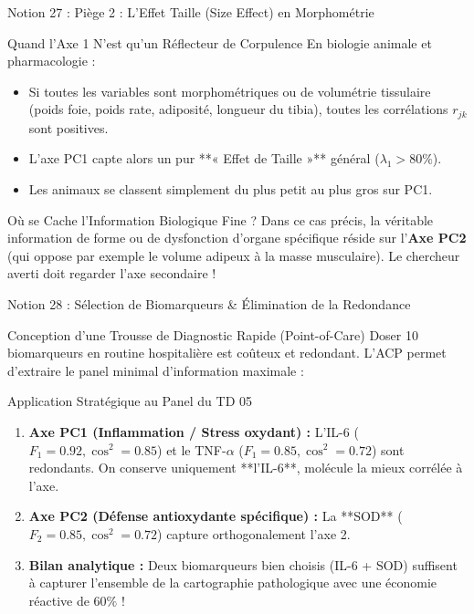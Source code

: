 \documentclass[aspectratio=169,10pt]{beamer}
\begin{document}
\begin{frame}{Notion 27 : Piège 2 : L'Effet Taille (Size Effect) en Morphométrie}
  \begin{warnbox}{Quand l'Axe 1 N'est qu'un Réflecteur de Corpulence}
    \footnotesize
    En biologie animale et pharmacologie :
    \begin{itemize}
      \item Si toutes les variables sont morphométriques ou de volumétrie tissulaire (poids foie, poids rate, adiposité, longueur du tibia), toutes les corrélations $r_{jk}$ sont positives.
      \item L'axe PC1 capte alors un pur **« Effet de Taille »** général ($\lambda_1 > 80\%$).
      \item Les animaux se classent simplement du plus petit au plus gros sur PC1.
    \end{itemize}
  \end{warnbox}
  \vspace{1mm}
  \begin{takeawaybox}{Où se Cache l'Information Biologique Fine ?}
    \footnotesize
    Dans ce cas précis, la véritable information de forme ou de dysfonction d'organe spécifique réside sur l'\textbf{Axe PC2} (qui oppose par exemple le volume adipeux à la masse musculaire). Le chercheur averti doit regarder l'axe secondaire !
  \end{takeawaybox}
\end{frame}

\begin{frame}{Notion 28 : Sélection de Biomarqueurs \& Élimination de la Redondance}
  \begin{conceptbox}{Conception d'une Trousse de Diagnostic Rapide (Point-of-Care)}
    \footnotesize
    Doser 10 biomarqueurs en routine hospitalière est coûteux et redondant. L'ACP permet d'extraire le panel minimal d'information maximale :
  \end{conceptbox}
  \vspace{1mm}
  \begin{biobox}{Application Stratégique au Panel du TD 05}
    \footnotesize
    \begin{enumerate}
      \item \textbf{Axe PC1 (Inflammation / Stress oxydant) :} L'IL-6 ($F_1 = 0.92, \cos^2 = 0.85$) et le TNF-$\alpha$ ($F_1 = 0.85, \cos^2 = 0.72$) sont redondants. On conserve uniquement **l'IL-6**, molécule la mieux corrélée à l'axe.
      \item \textbf{Axe PC2 (Défense antioxydante spécifique) :} La **SOD** ($F_2 = 0.85, \cos^2 = 0.72$) capture orthogonalement l'axe 2.
      \item \textbf{Bilan analytique :} Deux biomarqueurs bien choisis (IL-6 + SOD) suffisent à capturer l'ensemble de la cartographie pathologique avec une économie réactive de $60\%$ !
    \end{enumerate}
  \end{biobox}
\end{frame}
\end{document}
